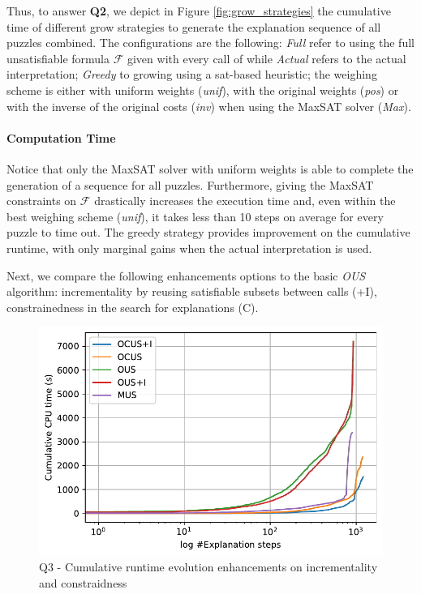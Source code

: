 Thus, to answer \textbf{Q2}, we depict in Figure \ref{fig:grow_strategies} the cumulative time of different grow strategies to generate the explanation sequence of all puzzles combined. The configurations are the following:  \emph{Full} refer to using the full unsatisfiable formula $\mathcal{F}$ given with every call of \comus while \emph{Actual} refers to the actual interpretation; \emph{Greedy} to growing using a sat-based heuristic; the weighing scheme is either with uniform weights (\emph{unif}), with the original weights (\emph{pos}) or with the inverse of the original costs (\emph{inv}) when using the MaxSAT solver (\emph{Max}).

\paragraph{Computation Time} Notice that only the MaxSAT solver with uniform weights is able to complete the generation of a sequence for all puzzles. Furthermore, giving the MaxSAT constraints on $\mathcal{F}$ drastically increases the execution time and, even within the best weighing scheme (\emph{unif}), it takes less than 10 steps on average for every puzzle to time out.
The greedy strategy provides improvement on the cumulative runtime, with only marginal gains when the actual interpretation is used.


Next, we compare the following enhancements options to the basic \emph{OUS} algorithm: incrementality by reusing satisfiable subsets between \omus calls (+I), constrainedness in the search for explanations (C).

\begin{figure}[ht]
  \centering
  \includegraphics[width=\columnwidth]{figures/rq4_b.pdf}
  \caption{Q3 - Cumulative runtime evolution enhancements on incrementality and constraidness}
  \label{fig:incrementality_constraindness}
\end{figure}


